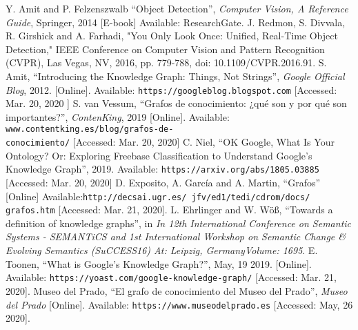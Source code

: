 \begin{thebibliography}{00}
  Y. Amit and P. Felzenszwalb
  ``Object Detection'',
  \textit{Computer Vision, A Reference Guide}, Springer, 2014
  [E-book] Available: ResearchGate.
J. Redmon, S. Divvala, R. Girshick and A. Farhadi, "You Only Look Once: Unified, Real-Time Object Detection," IEEE Conference on Computer Vision and Pattern Recognition (CVPR), Las Vegas, NV, 2016, pp. 779-788, doi: 10.1109/CVPR.2016.91.
  S. Amit, ``Introducing the Knowledge Graph: Things, Not Strings'',
  \textit{Google Official Blog}, 2012. [Online]. Available: 
  \texttt{https://googleblog.blogspot.com} [Accessed: Mar. 20, 2020 ]
  S. van Vessum, ``Grafos de conocimiento: ¿qué son y por qué son
  importantes?'', \textit{ContenKing}, 2019 [Online]. Available:
  \texttt{www.contentking.es/blog/grafos-de- \\conocimiento/}
  [Accessed: Mar. 20, 2020]   
  C. Niel, ``OK Google, What Is Your Ontology? Or: Exploring Freebase
  Classification to Understand Google’s Knowledge Graph'', 2019.
  Available: \texttt{https://arxiv.org/abs/1805.03885} [Accessed: Mar. 20, 2020]
  D. Exposito, A. García and A. Martin, ``Grafos'' [Online]
  Available:\texttt{http://decsai.ugr.es/~jfv/ed1/tedi/cdrom/docs/ 
  \\grafos.htm}
  [Accessed: Mar. 21, 2020].
  L. Ehrlinger and W. Wöß, ``Towards a definition of knowledge 
  graphs'', in \textit{In 12th 
  International Conference on Semantic Systems - SEMANTiCS and 1st International Workshop on Semantic Change \& Evolving Semantics (SuCCESS16)
  At: Leipzig, GermanyVolume: 1695}.
  E. Toonen, ``What is Google’s Knowledge Graph?'', May, 19 2019. [Online].
  Available: \texttt{https://yoast.com/google-knowledge-graph/}  
  [Accessed: Mar. 21, 2020].
  Museo del Prado, ``El grafo de conocimiento del Museo del Prado'', 
  \textit{Museo del Prado} [Online]. Available: 
  \texttt{https://www.museodelprado.es} [Accessed: May, 26 2020].

\end{thebibliography}

